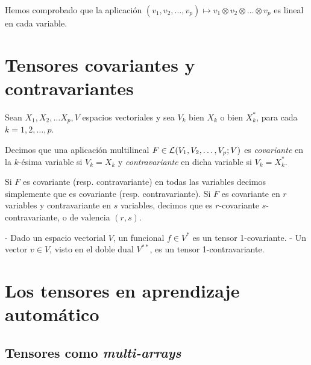 Hemos comprobado que la aplicación
\((v_1,v_2,\dots,v_p)\mapsto v_1\otimes v_2\otimes\dots\otimes v_p\) es
lineal en cada variable. \reme

\section{Tensores covariantes y
contravariantes}\label{tensores-covariantes-y-contravariantes}

Sean \(X_1,X_2,\dots X_p,V\) espacios vectoriales y sea \(V_k\) bien
\(X_k\) o bien \(X_k^*\), para cada \(k=1,2,\dots,p\).

Decimos que una aplicación multilineal \(F\in \mathcal{L}(V_1,V_2,\dots,V_p;V)\)
es \emph{covariante} en la \(k\)-ésima variable si \(V_k=X_k\) y
\emph{contravariante} en dicha variable si \(V_k=X_k^*\).

Si \(F\) es covariante (resp. contravariante) en todas las variables
decimos simplemente que es covariante (resp. contravariante). Si \(F\)
es covariante en \(r\) variables y contravariante en \(s\) variables,
decimos que es \(r\)-covariante \(s\)-contravariante, o de valencia
\((r, s)\). 

\exampleb
- Dado un espacio vectorial \(V\), un funcional \(f\in V^*\) es un
tensor 1-covariante. - Un vector \(v\in V\), visto en el doble dual
\(V^{**}\), es un tensor 1-contravariante. \examplee

\section{Los tensores en aprendizaje
automático}\label{los-tensores-en-aprendizaje-automuxe1tico}

\subsection*{\texorpdfstring{Tensores como
\emph{multi-arrays}}{Tensores como multi-arrays}}\label{tensores-como-multi-arrays}
